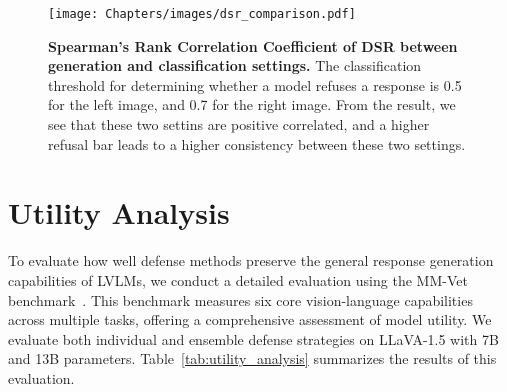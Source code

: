 \begin{figure*}[!ht]
    \centering
    \texttt{[image: Chapters/images/dsr\_comparison.pdf]}
    \caption{\textbf{Spearman's Rank Correlation Coefficient of DSR between generation and classification settings.} The classification threshold for determining whether a model refuses a response is 0.5 for the left image, and 0.7 for the right image. From the result, we see that these two settins are positive correlated, and a higher refusal bar leads to a higher consistency between these two settings.}
    \label{fig:dsr_comparison}
\end{figure*}

\section{Utility Analysis}
\label{sec:utility}
To evaluate how well defense methods preserve the general response generation capabilities of LVLMs, we conduct a detailed evaluation using the MM-Vet benchmark~\cite{yu2023mm}. This benchmark measures six core vision-language capabilities across multiple tasks, offering a comprehensive assessment of model utility. We evaluate both individual and ensemble defense strategies on LLaVA-1.5 with 7B and 13B parameters.
Table~\ref{tab:utility_analysis} summarizes the results of this evaluation.

